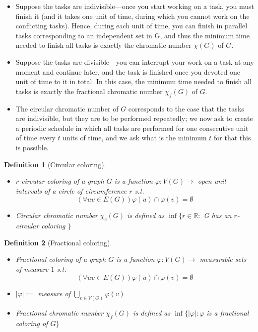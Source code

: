 \documentclass{article}
\newtheorem*{definition}{Definition}
\begin{document}
\begin{itemize}
	\item Suppose the tasks are indivisible—once you start working on a
		task, you must finish it (and it takes one unit of time, during
		which you cannot work on the conflicting tasks). Hence, during
		each unit of time, you can finish in parallel tasks
		corresponding to an independent set in G, and thus the minimum
		time needed to finish all tasks is exactly the chromatic number
		$\chi(G)$ of $G$.
	\item Suppose the tasks are divisible—you can interrupt your work on a
		task at any moment and continue later, and the task is finished
		once you devoted one unit of time to it in total. In this case,
		the minimum time needed to finish all tasks is exactly the
		fractional chromatic number $\chi_f(G)$ of $G$.
	\item The circular chromatic number of $G$ corresponds to the case
		that the tasks are indivisible, but they are to be performed
		repeatedly; we now ask to create a periodic schedule in which
		all tasks are performed for one consecutive unit of time every
		$t$ units of time, and we ask what is the minimum $t$ for that
		this is possible.
\end{itemize}

\begin{definition}[Circular coloring]
	~
	\begin{itemize}
		\item \emph{$r$-circular coloring} of a graph $G$ is a function
			$\varphi: V(G) \rightarrow$ open unit intervals of a
			circle of circumference $r$ s.t. $$ (\forall uv \in
			E(G)) \varphi(u) \cap \varphi(v) = \emptyset $$
		\item \emph{Circular chromatic number} $\chi_c(G)$ is defined
			as $\inf\{r \in \mathbb{R}:$ G has an $r$-circular
			coloring $\}$
	\end{itemize}
\end{definition}

\begin{definition}[Fractional coloring]
	~
	\begin{itemize}
		\item \emph{Fractional coloring} of a graph $G$ is a function
			$\varphi: V(G) \rightarrow$ measurable sets of measure
			$1$ s.t. $$ (\forall uv \in E(G)) \varphi(u) \cap
			\varphi(v) = \emptyset $$
		\item $|\varphi| :=$ measure of $\bigcup_{v \in V(G)}
			\varphi(v)$
		\item \emph{Fractional chromatic number} $\chi_f(G)$ is defined
			as $\inf\{|\varphi|: \varphi$ is a fractional coloring
			of $G\}$
	\end{itemize}
\end{definition}
\end{document}
